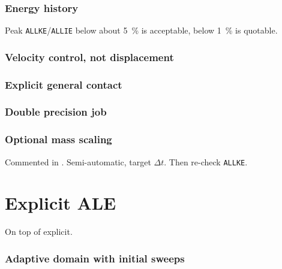 \documentclass[11pt,a4paper]{article}
\begin{document}


\subsubsection*{Energy history}

Peak \texttt{ALLKE}/\texttt{ALLIE} below about 5~\% is acceptable, below 1~\%
is quotable.



\subsubsection*{Velocity control, not displacement}



\subsubsection*{Explicit general contact}



\subsubsection*{Double precision job}



\subsubsection*{Optional mass scaling}

Commented in . Semi-automatic, target $\Delta t$.
Then re-check \texttt{ALLKE}.

\section{Explicit ALE}

On top of explicit. 

\subsubsection*{Adaptive domain with initial sweeps}
\end{document}
